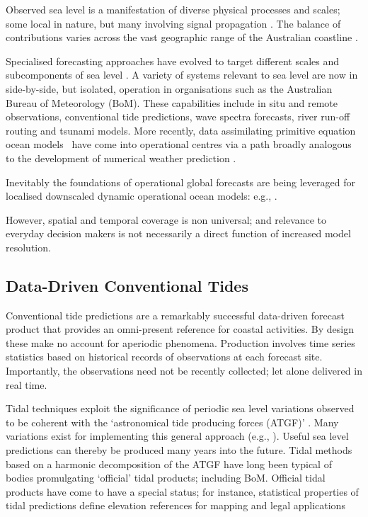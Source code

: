 \documentclass[jmse,article,accept,moreauthors,pdftex,10pt,a4paper]{mdpi}
\begin{document}
Observed sea level is a manifestation of diverse physical processes and scales; some local in nature, but many involving signal propagation \cite{Anonymous:jdDiSHB0}.
The balance of contributions varies across the vast geographic range of the Australian coastline \cite{Haigh:2013bna,Haigh:2013hea,Woodham:2013cl,Ridgway:2004kb,Church:1986tl,Allen:2009tf}.

Specialised forecasting approaches have evolved to target different scales and subcomponents of sea level \cite{Cartwright:2000tt,Petersen:2012kp}.
A variety of systems relevant to sea level are now in side-by-side, but isolated, operation in organisations such as the Australian Bureau of Meteorology (BoM). 
These capabilities include in situ and remote observations, conventional tide predictions, wave spectra forecasts, river run-off routing and tsunami models. 
More recently, data assimilating primitive equation ocean models~\cite{Schiller:2011di} have come into operational centres via a path broadly analogous to the development of numerical weather prediction \cite{Harper:kb}. 

Inevitably the foundations of operational global forecasts are being leveraged for localised downscaled dynamic operational ocean models: e.g., \cite{Paramygin:2017dx,Yang:2016ep,Wei:2014ex,Peng:2014kq}.

However, spatial and temporal coverage is non universal; and relevance to everyday decision makers is not necessarily a direct function of increased model resolution.  


\subsection{Data-Driven Conventional Tides}
\label{sec:tide_intro}

Conventional tide predictions are a remarkably successful data-driven forecast product that provides an omni-present reference for coastal activities.
By design these make no account for aperiodic phenomena. 
Production involves time series statistics based on historical records of observations at each forecast site.
Importantly, the observations need not be recently collected; let alone delivered in real time.

Tidal techniques exploit the significance of periodic sea level variations observed to be coherent with the `astronomical tide producing forces (ATGF)' \cite{Hendershott:1981ub}.     
Many variations exist for implementing this general approach (e.g., \cite{Foreman:2009bg,Groves:1975ky,LEFFLER:2009ej,Smith:1997ut} ). 
Useful sea level predictions can thereby be produced many years into the future.  
Tidal methods based on a harmonic decomposition of the ATGF have long been typical of bodies promulgating `official' tidal products; including BoM.
Official tidal products have come to have a special status; for instance, statistical properties of tidal predictions define elevation references for mapping and legal applications \cite{Mapping:2014wu}
\end{document}

